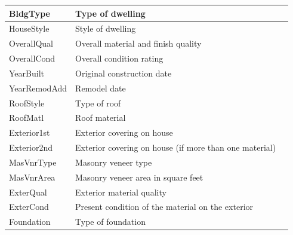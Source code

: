 \begin{longtable}{|l|p{3cm}|p{4cm}|}
    \hline
    BldgType         & Type of dwelling                                                                                 \\
    \hline
    HouseStyle       & Style of dwelling                                                                                \\
    \hline
    OverallQual      & Overall material and finish quality                                                              \\
    \hline
    OverallCond      & Overall condition rating                                                                         \\
    \hline
    YearBuilt        & Original construction date                                                                       \\
    \hline
    YearRemodAdd     & Remodel date                                                                                     \\
    \hline
    RoofStyle        & Type of roof                                                                                     \\
    \hline
    RoofMatl         & Roof material                                                                                    \\
    \hline
    Exterior1st      & Exterior covering on house                                                                       \\
    \hline
    Exterior2nd      & Exterior covering on house (if more than one material)                                           \\
    \hline
    MasVnrType       & Masonry veneer type                                                                              \\
    \hline
    MasVnrArea       & Masonry veneer area in square feet                                                               \\
    \hline
    ExterQual        & Exterior material quality                                                                        \\
    \hline
    ExterCond        & Present condition of the material on the exterior                                                \\
    \hline
    Foundation       & Type of foundation                                                                               \\

\end{longtable}
